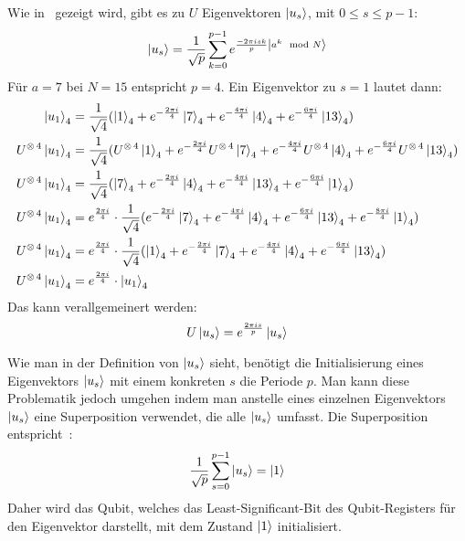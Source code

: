 Wie in~\cite[227]{nielsen_chuang_2010} gezeigt wird, gibt es zu \(U\) Eigenvektoren \(\ket{u_s}\), 
mit \(0 \leq s \leq p-1\): 
\[\ket{u_s} =
\frac{1}{\sqrt{p}}
\sum_{k=0}^{p-1} e^{\frac{-2 \pi i s k}{p}\ket{a^k \mod N}} 
\]
Für \(a=7\) bei \(N=15\) entspricht \(p=4\).
Ein Eigenvektor zu \(s=1\) lautet dann:
\begin{align*}
    \ket{u_1}_4 &=
    \frac{1}{\sqrt{4}}(
        \ket{1}_4 + 
        e^{-\frac{2 \pi i}{4}}\ket{7}_4 + 
        e^{-\frac{4 \pi i}{4}}\ket{4}_4+ 
        e^{-\frac{6 \pi i}{4}}\ket{13}_4
    )\\   
    U^{\operatorname{\otimes} 4}\ket{u_1}_4 &=
    \frac{1}{\sqrt{4}}(
        U^{\operatorname{\otimes} 4}\ket{1}_4 + 
        e^{-\frac{2 \pi i}{4}}U^{\operatorname{\otimes} 4}\ket{7}_4 + 
        e^{-\frac{4 \pi i}{4}}U^{\operatorname{\otimes} 4}\ket{4}_4+ 
        e^{-\frac{6 \pi i}{4}}U^{\operatorname{\otimes} 4}\ket{13}_4
    )\\
    U^{\operatorname{\otimes} 4}\ket{u_1}_4 &=
    \frac{1}{\sqrt{4}}(
        \ket{7}_4 + 
        e^{-\frac{2 \pi i}{4}}\ket{4}_4 + 
        e^{-\frac{4 \pi i}{4}}\ket{13}_4+ 
        e^{-\frac{6 \pi i}{4}}\ket{1}_4
    )\\
    U^{\operatorname{\otimes} 4}\ket{u_1}_4 &=
    e^{\frac{2 \pi i}{4}}
    \cdot
    \frac{1}{\sqrt{4}}(
        e^{-\frac{2 \pi i}{4}}\ket{7}_4 + 
        e^{-\frac{4 \pi i}{4}}\ket{4}_4 + 
        e^{-\frac{6 \pi i}{4}}\ket{13}_4+ 
        e^{-\frac{8 \pi i}{4}}\ket{1}_4
    )\\
    U^{\operatorname{\otimes} 4}\ket{u_1}_4 &=
    e^{\frac{2 \pi i}{4}}
    \cdot
    \frac{1}{\sqrt{4}}(
        \ket{1}_4 +
        e^{-\frac{2 \pi i}{4}}\ket{7}_4 + 
        e^{-\frac{4 \pi i}{4}}\ket{4}_4 + 
        e^{-\frac{6 \pi i}{4}}\ket{13}_4 )\\
    U^{\operatorname{\otimes} 4}\ket{u_1}_4&=
    e^{\frac{2 \pi i}{4}} \cdot
    \ket{u_1}_4
\end{align*}
Das kann verallgemeinert werden:
\[U\ket{u_s} = e^{\frac{2 \pi i s}{p}}\ket{u_s}\]

Wie man in der Definition von \(\ket{u_s}\) 
sieht, 
benötigt die Initialisierung eines Eigenvektors \(\ket{u_s}\) mit einem konkreten \(s\) die Periode \(p\).
Man kann diese Problematik jedoch umgehen indem man anstelle eines einzelnen Eigenvektors \(\ket{u_s}\)
eine Superposition verwendet, die alle \(\ket{u_s}\) umfasst.
Die Superposition entspricht~\autocite[227]{nielsen_chuang_2010}:
\[\frac{1}{\sqrt{p}} \sum_{s=0}^{p-1}\ket{u_s} = \ket{1}\] 
Daher wird das Qubit, welches das Least-Significant-Bit des Qubit-Registers für den Eigenvektor darstellt, 
mit dem Zustand \(\ket{1}\) initialisiert.

